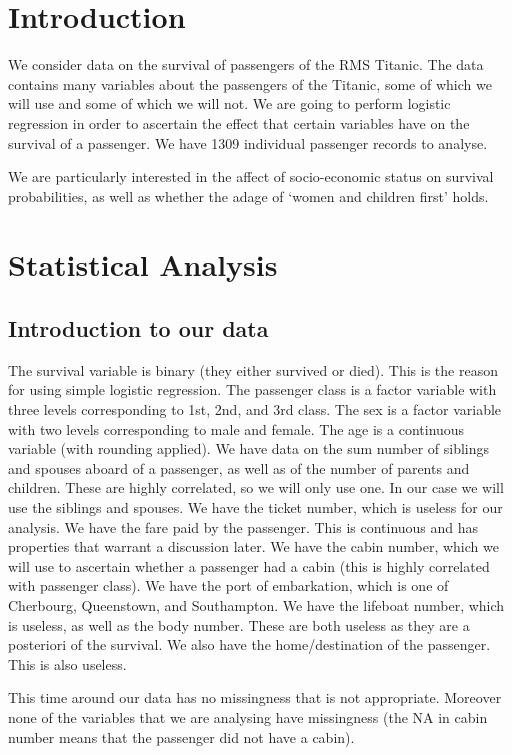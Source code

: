 \documentclass[]{extarticle}
\begin{document}
\section{Introduction}

We consider data on the survival of passengers of the RMS Titanic. The data contains many variables about the passengers of the Titanic, some of which we will use and some of which we will not. We are going to perform logistic regression in order to ascertain the effect that certain variables have on the survival of a passenger. We have 1309 individual passenger records to analyse. 

We are particularly interested in the affect of socio-economic status on survival probabilities, as well as whether the adage of `women and children first' holds.

\section{Statistical Analysis}

\subsection{Introduction to our data}

The survival variable is binary (they either survived or died). This is the reason for using simple logistic regression. The passenger class is a factor variable with three levels corresponding to 1st, 2nd, and 3rd class. The sex is a factor variable with two levels corresponding to male and female. The age is a continuous variable (with rounding applied). We have data on the sum number of siblings and spouses aboard of a passenger, as well as of the number of parents and children. These are highly correlated, so we will only use one. In our case we will use the siblings and spouses. We have the ticket number, which is useless for our analysis. We have the fare paid by the passenger. This is continuous and has properties that warrant a discussion later. We have the cabin number, which we will use to ascertain whether a passenger had a cabin (this is highly correlated with passenger class). We have the port of embarkation, which is one of Cherbourg, Queenstown, and Southampton. We have the lifeboat number, which is useless, as well as the body number. These are both useless as they are a posteriori of the survival. We also have the home/destination of the passenger. This is also useless.

This time around our data has no missingness that is not appropriate. Moreover none of the variables that we are analysing have missingness (the NA in cabin number means that the passenger did not have a cabin). 
\end{document}
